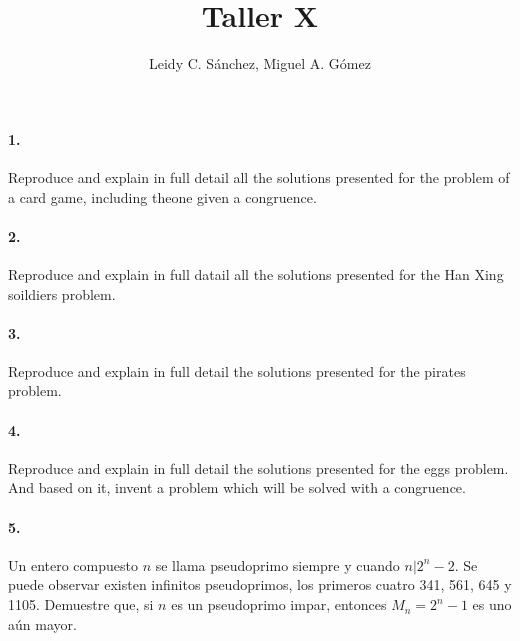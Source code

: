 \documentclass{article}
\begin{document}
	\title{Taller X}
	\author{Leidy C. Sánchez, Miguel A. Gómez}
	\maketitle

\paragraph{1.} Reproduce and explain in full detail all the solutions presented for the problem of a card game, including theone given a congruence.

\paragraph{2.} Reproduce and explain in full datail all the solutions presented for the Han Xing soildiers problem.

\paragraph{3.} Reproduce and explain in full detail the solutions presented for the pirates problem.

\paragraph{4.} Reproduce and explain in full detail the solutions presented for the eggs problem. And based on it, invent a problem which will be solved with a congruence.

\paragraph{5.} Un entero compuesto $n$ se llama pseudoprimo siempre y cuando $n|2^n - 2$. Se puede observar existen infinitos pseudoprimos, los primeros cuatro 341, 561, 645 y 1105. Demuestre que, si $n$ es un pseudoprimo impar, entonces $M_n = 2^n - 1$ es uno aún mayor.
\end{document}
